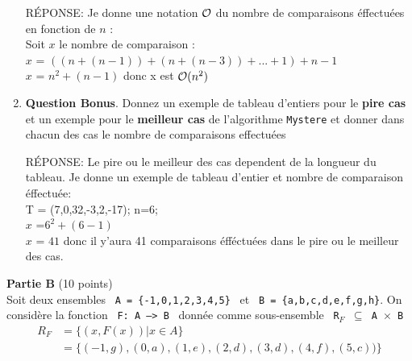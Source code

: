 \begin{enumerate}[1)]
\begin{framed}
R\'EPONSE:
Je donne une notation ${\cal O}$ du nombre de comparaisons éffectuées en fonction de $n$ : \\
Soit $x$ le nombre de comparaison : \\
$x$ = $((n+(n-1))+(n+(n-3))+...+1)+n-1$ \\
$x$ = $n^2+(n-1)$ donc x est ${\cal O}(n^2)$ \\

\end{framed}

\item {} {\bf Question Bonus}.
Donnez un exemple de tableau d'entiers pour le {\bf pire cas} et un exemple pour le {\bf meilleur cas} de l'algorithme {\tt Mystere} et donner dans chacun des cas le nombre de comparaisons effectu\'ees

\begin{framed}
R\'EPONSE:
Le pire ou le meilleur des cas dependent de la longueur du tableau.
Je donne un exemple de tableau d'entier  et nombre de comparaison éffectuée: \\
T = (7,0,32,-3,2,-17); n=6; \\
$x$ =$6^2+(6-1)$ \\
$x$ = $41$ donc il y'aura 41 comparaisons éfféctuées dans le pire ou le meilleur des cas. \\
\end{framed}

\end{enumerate}
%



\newpage
\textbf{Partie B} (10 points)\\

Soit  deux ensembles ~{\tt A = \{-1,0,1,2,3,4,5\}}~  et  ~{\tt B = \{a,b,c,d,e,f,g,h\}}. On consid\`ere la fonction ~{\tt F: A --> B}~ donn\'ee  comme sous-ensemble~  {\tt R$_F$ $ \subseteq$ A $\times$ B} 
\begin{align*}
  R_F &= \{ (x,F(x)) | x\in A \}\\
   &= \{(-1,g),(0,a),(1,e),(2,d),(3,d),(4,f),(5,c))\}
\end{align*}



